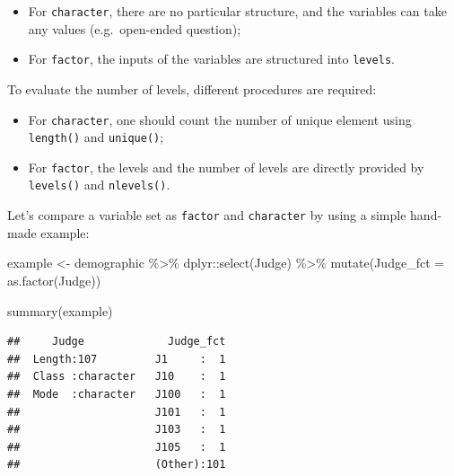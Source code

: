 \documentclass[
]{krantz}
\makeatletter
\newenvironment{Shaded}{\begin{snugshade}}{\end{snugshade}}
\newcommand{\AttributeTok}[1]{\textcolor[rgb]{0.61,0.61,0.61}{#1}}
\newcommand{\FunctionTok}[1]{\textcolor[rgb]{0,0,0}{#1}}
\newcommand{\NormalTok}[1]{#1}
\newcommand{\OtherTok}[1]{\textcolor[rgb]{0.37,0.37,0.37}{#1}}
\newcommand{\SpecialCharTok}[1]{\textcolor[rgb]{0,0,0}{#1}}
\providecommand{\tightlist}{%
  \setlength{\itemsep}{0pt}\setlength{\parskip}{0pt}}
\newenvironment{kframe}{%
\medskip{}
\setlength{\fboxsep}{.8em}
 \def\at@end@of@kframe{}%
 \ifinner\ifhmode%
  \def\at@end@of@kframe{\end{minipage}}%
  \begin{minipage}{\columnwidth}%
 \fi\fi%
 \def\FrameCommand##1{\hskip\@totalleftmargin \hskip-\fboxsep
 \colorbox{shadecolor}{##1}\hskip-\fboxsep
     \hskip-\linewidth \hskip-\@totalleftmargin \hskip\columnwidth}%
 \MakeFramed {\advance\hsize-\width
   \@totalleftmargin\z@ \linewidth\hsize
   \@setminipage}}%
 {\par\unskip\endMakeFramed%
 \at@end@of@kframe}
\renewenvironment{Shaded}{\begin{kframe}}{\end{kframe}}
\makeatother
\begin{document}
\begin{itemize}
\tightlist
\item
  For \texttt{character}, there are no particular structure, and the variables can take any values (e.g.~open-ended question);
\item
  For \texttt{factor}, the inputs of the variables are structured into \texttt{levels}.
\end{itemize}

To evaluate the number of levels, different procedures are required:

\begin{itemize}
\tightlist
\item
  For \texttt{character}, one should count the number of unique element using \texttt{length()} and \texttt{unique()};
\item
  For \texttt{factor}, the levels and the number of levels are directly provided by \texttt{levels()} and \texttt{nlevels()}.
\end{itemize}

Let's compare a variable set as \texttt{factor} and \texttt{character} by using a simple hand-made example:

\begin{Shaded}
\begin{Highlighting}[]
\NormalTok{example }\OtherTok{\textless{}{-}}\NormalTok{ demographic }\SpecialCharTok{\%\textgreater{}\%} 
\NormalTok{  dplyr}\SpecialCharTok{::}\FunctionTok{select}\NormalTok{(Judge) }\SpecialCharTok{\%\textgreater{}\%} 
  \FunctionTok{mutate}\NormalTok{(}\AttributeTok{Judge\_fct =} \FunctionTok{as.factor}\NormalTok{(Judge))}

\FunctionTok{summary}\NormalTok{(example)}
\end{Highlighting}
\end{Shaded}

\begin{verbatim}
##     Judge             Judge_fct  
##  Length:107         J1     :  1  
##  Class :character   J10    :  1  
##  Mode  :character   J100   :  1  
##                     J101   :  1  
##                     J103   :  1  
##                     J105   :  1  
##                     (Other):101
\end{verbatim}

\begin{Shaded}
\end{Shaded}
\end{document}

